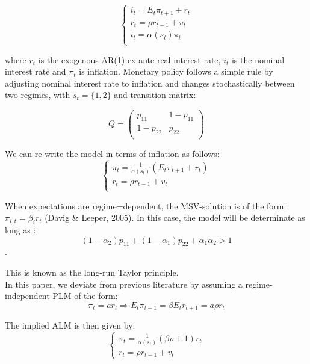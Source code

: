 \documentclass[12pt,reqno]{article}
\numberwithin{equation}{section}
\begin{document}
$$
\begin{cases}
i_t = E_t \pi_{t+1} + r_t \\
r_t = \rho r_{t-1} + v_t \\
i_t = \alpha(s_t) \pi_t \\
\end{cases}
$$

where $ r_t $ is the exogenous AR(1) ex-ante real interest rate, $ i_t $ is the nominal interest rate and $\pi_t $ is inflation. Monetary policy follows a simple rule by adjusting nominal interest rate to inflation and changes stochastically between two regimes, with $s_t = \{1,2 \} $ and transition matrix:

$$
Q=\begin{pmatrix}
p_{11} & 1-p_{11} \\
1-p_{22} & p_{22} \\
\end{pmatrix}
$$

We can re-write the model in terms of inflation as follows: \\

$$
\begin{cases}
\pi_t = \frac{1}{\alpha(s_t)}(E_t \pi_{t+1} + r_t) \\
r_t = \rho r_{t-1} + v_t \\
\end{cases}
$$

When expectations are regime=dependent, the MSV-solution is of the form: $ \pi_{i,t} = \beta_i r_t $ (Davig \& Leeper, 2005). In this case, the model will be determinate as long as :\\

$$ (1-\alpha_2) p_{11} +(1-\alpha_1) p_{22} + \alpha_1 \alpha_2 > 1 $$. 

This is known as the long-run Taylor principle.\\
 

In this paper, we deviate from previous literature by assuming a regime-independent PLM of the form: \\

$$
\pi_t = a r_t  \Rightarrow E_t \pi_{t+1} = \beta E_t r_{t+1} = a \rho r_t 
$$

The implied ALM is then given by: \\

$$
\begin{cases}
\pi_t = \frac{1}{\alpha(s_t)} (\beta \rho + 1) r_t \\
r_t= \rho r_{t-1} + v_t 
\end{cases}
$$ 
\end{document}
